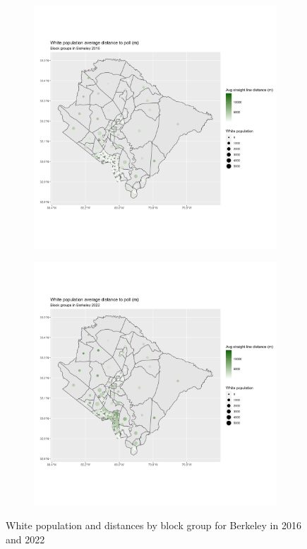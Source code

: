 \documentclass[11pt]{article}
\theoremstyle{remark}
\theoremstyle{definition}
\begin{document}
\begin{figure}
	\begin{subfigure}{.5\textwidth}
		\centering
		\includegraphics[width=\linewidth]{result analysis/Berkeley_SC_original_configs/white_pop_and_dist_Berkeley_config_original_2016_polls.png}
		\label{sfig:York_2016_bg_dist_pop}
	\end{subfigure} 
	\begin{subfigure}{.5\textwidth}
		\centering
		\includegraphics[width=\linewidth]{result analysis/Berkeley_SC_original_configs/white_pop_and_dist_Berkeley_config_original_2022_polls.png}
		\label{sfig:Berkeley_2022_bg_dist}
	\end{subfigure}
	\caption{White population and distances by block group for Berkeley in 2016 and 2022}
	\label{fig:Berkeley distance White population maps}
\end{figure}
\end{document}
